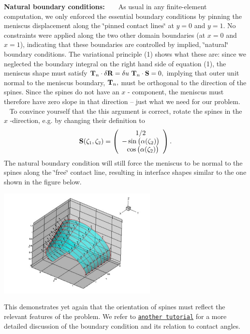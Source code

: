 \begin{DoxyEnumerate}
\item {\bfseries Natural boundary conditions\+:} ~\newline
~\newline
 As usual in any finite-\/element computation, we only enforced the essential boundary conditions by pinning the meniscus displacement along the \char`\"{}pinned contact lines\char`\"{} at $ y=0 $ and $ y=1. $ No constraints were applied along the two other domain boundaries (at $ x=0 $ and $ x=1 $), indicating that these boundaries are controlled by implied, \char`\"{}natural\char`\"{} boundary conditions. The variational principle (1) shows what these are\+: since we neglected the boundary integral on the right hand side of equation (1), the meniscus shape must satisfy $ {\bf T}_n \cdot \delta {\bf R} = \delta u \ {\bf T}_n \cdot {\bf S} = 0, $ implying that outer unit normal to the meniscus boundary, $ {\bf T}_n, $ must be orthogonal to the direction of the spines. Since the spines do not have an $ x $ -\/ component, the meniscus must therefore have zero slope in that direction -- just what we need for our problem. ~\newline
~\newline
 To convince yourself that the this argument is correct, rotate the spines in the $ x $ -\/direction, e.\+g. by changing their definition to \[ {\bf S}(\zeta_1,\zeta_2) = \left( \begin{array}{c} 1/2 \\ -\sin\big(\alpha(\zeta_2)\big) \\ \ \ \cos\big(\alpha(\zeta_2)\big) \\ \end{array} \right). \] The natural boundary condition will still force the meniscus to be normal to the spines along the \char`\"{}free\char`\"{} contact line, resulting in interface shapes similar to the one shown in the figure below.  
\begin{DoxyImage}
\includegraphics[width=0.6\textwidth]{funky_meniscus}
\end{DoxyImage}
 This demonstrates yet again that the orientation of spines must reflect the relevant features of the problem. We refer to \href{../../contact_angle/html/index.html}{\tt another tutorial} for a more detailed discussion of the boundary condition and its relation to contact angles. ~\newline
~\newline


\end{DoxyEnumerate}
